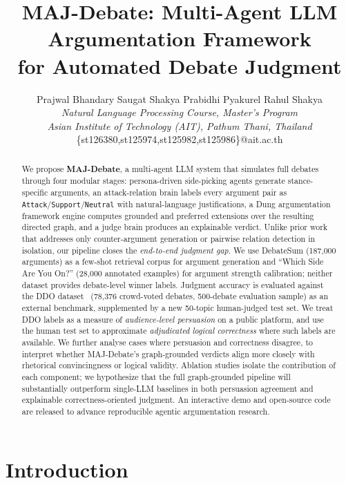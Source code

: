 \documentclass[11pt,twocolumn,letterpaper]{article}
\title{MAJ-Debate: Multi-Agent LLM Argumentation Framework\\
       for Automated Debate Judgment}
\author{Prajwal Bhandary \quad Saugat Shakya \quad Prabidhi Pyakurel \quad Rahul Shakya \\[0.3em]
        {\small\itshape Natural Language Processing Course, Master's Program} \\
        {\small\itshape Asian Institute of Technology (AIT), Pathum Thani, Thailand} \\
        {\small\ttfamily \{st126380,st125974,st125982,st125986\}@ait.ac.th}}
\date{}
\newcommand{\DebateSumArgs}{187{,}000}
\newcommand{\WhichSideArgs}{28{,}000}
\newcommand{\HumanTestTopics}{50}
\newcommand{\DDOTotal}{78{,}376}
\newcommand{\DDOSample}{500}
\begin{document}
\maketitle

\begin{abstract}
We propose \textbf{MAJ-Debate}, a multi-agent LLM system that simulates
full debates through four modular stages: persona-driven side-picking agents
generate stance-specific arguments, an attack-relation brain labels every
argument pair as \texttt{Attack}/\texttt{Support}/\texttt{Neutral} with
natural-language justifications, a Dung argumentation framework engine
computes grounded and preferred extensions over the resulting directed graph,
and a judge brain produces an explainable verdict. Unlike prior work that
addresses only counter-argument generation or pairwise relation detection
in isolation, our pipeline closes the \textit{end-to-end judgment gap}.
We use DebateSum (\DebateSumArgs{} arguments) as a few-shot retrieval corpus
for argument generation and ``Which Side Are You On?'' (\WhichSideArgs{}
annotated examples) for argument strength calibration; neither dataset
provides debate-level winner labels. Judgment accuracy is evaluated against
the DDO dataset~\citep{durmus2019ddo} (\DDOTotal{} crowd-voted debates,
\DDOSample-debate evaluation sample) as an external benchmark, supplemented
by a new \HumanTestTopics-topic human-judged test set. We treat DDO labels
as a measure of \textit{audience-level persuasion} on a public platform,
and use the human test set to approximate \textit{adjudicated logical
correctness} where such labels are available. We further analyse cases
where persuasion and correctness disagree, to interpret whether
MAJ-Debate's graph-grounded verdicts align more closely with rhetorical
convincingness or logical validity. Ablation studies isolate the
contribution of each component; we hypothesize that the full graph-grounded
pipeline will substantially outperform single-LLM baselines in both
persuasion agreement and explainable correctness-oriented judgment.
An interactive demo and open-source code are released to advance
reproducible agentic argumentation research.
\end{abstract}

\section{Introduction}
\end{document}
